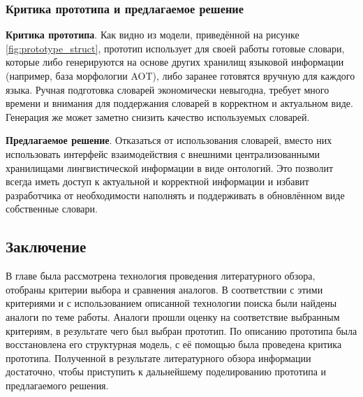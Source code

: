 \subsubsection{Критика прототипа и предлагаемое решение}

\textbf{Критика прототипа}. Как видно из модели, приведённой на рисунке \ref{fig:prototype_struct}, прототип использует для своей работы готовые словари, которые либо  генерируются на основе других хранилищ языковой информации (например, база морфологии AOT), либо заранее готовятся вручную для каждого языка. Ручная подготовка словарей экономически невыгодна, требует много времени и внимания для поддержания словарей в корректном и актуальном виде. Генерация же может заметно снизить качество используемых словарей.

\textbf{Предлагаемое решение}. Отказаться от использования словарей, вместо них использовать интерфейс взаимодействия с внешними централизованными хранилищами лингвистической информации в виде онтологий. Это позволит всегда иметь доступ к актуальной и корректной информации и избавит разработчика от необходимости наполнять и поддерживать в обновлённом виде собственные словари.

\subsection{Заключение}

В главе была рассмотрена технология проведения литературного обзора, отобраны критерии выбора и сравнения аналогов. В соответствии с этими критериями и с использованием описанной технологии поиска были найдены аналоги по теме работы. Аналоги прошли оценку на соответствие выбранным критериям, в результате чего был выбран прототип. По описанию прототипа была восстановлена его структурная модель, с её помощью была проведена критика прототипа. Полученной в результате литературного обзора информации достаточно, чтобы приступить к дальнейшему поделированию прототипа и предлагаемого решения.

